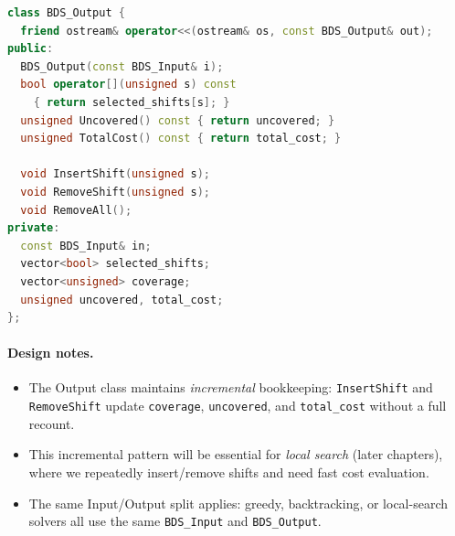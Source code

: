 \begin{lstlisting}[language=C++,
  caption={\texttt{BDS\_Data.hh} --- Output class (excerpt).},
  label={lst:bds-output}]
class BDS_Output {
  friend ostream& operator<<(ostream& os, const BDS_Output& out);
public:
  BDS_Output(const BDS_Input& i);
  bool operator[](unsigned s) const
    { return selected_shifts[s]; }
  unsigned Uncovered() const { return uncovered; }
  unsigned TotalCost() const { return total_cost; }

  void InsertShift(unsigned s);
  void RemoveShift(unsigned s);
  void RemoveAll();
private:
  const BDS_Input& in;
  vector<bool> selected_shifts;
  vector<unsigned> coverage;
  unsigned uncovered, total_cost;
};
\end{lstlisting}

\paragraph{Design notes.}
\begin{itemize}[nosep]
  \item The Output class maintains \emph{incremental}
    bookkeeping: \texttt{InsertShift} and \texttt{RemoveShift}
    update \texttt{coverage}, \texttt{uncovered}, and
    \texttt{total\_cost} without a full recount.
  \item This incremental pattern will be essential for
    \emph{local search} (later chapters), where we repeatedly
    insert/remove shifts and need fast cost evaluation.
  \item The same Input/Output split applies: greedy,
    backtracking, or local-search solvers all use the same
    \texttt{BDS\_Input} and \texttt{BDS\_Output}.
\end{itemize}

